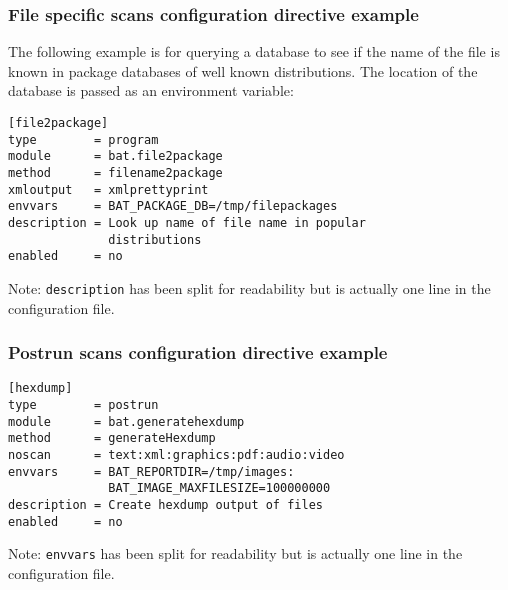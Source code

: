 \documentclass[11pt]{beamer}
\begin{document}
\begin{frame}[fragile]
\frametitle{File specific scans configuration directive example}
The following example is for querying a database to see if the name of the file is known in package databases of well known distributions. The location of the database is passed as an environment variable:

\begin{verbatim}
[file2package]
type        = program
module      = bat.file2package
method      = filename2package
xmloutput   = xmlprettyprint
envvars     = BAT_PACKAGE_DB=/tmp/filepackages
description = Look up name of file name in popular
              distributions
enabled     = no
\end{verbatim}
Note: \texttt{description} has been split for readability but is actually one line in the configuration file.
\end{frame}

\begin{frame}[fragile]
\frametitle{Postrun scans configuration directive example}
\begin{verbatim}
[hexdump]
type        = postrun
module      = bat.generatehexdump
method      = generateHexdump
noscan      = text:xml:graphics:pdf:audio:video
envvars     = BAT_REPORTDIR=/tmp/images:
              BAT_IMAGE_MAXFILESIZE=100000000
description = Create hexdump output of files
enabled     = no
\end{verbatim}

Note: \texttt{envvars} has been split for readability but is actually one line in the configuration file.
\end{frame}


\end{document}
